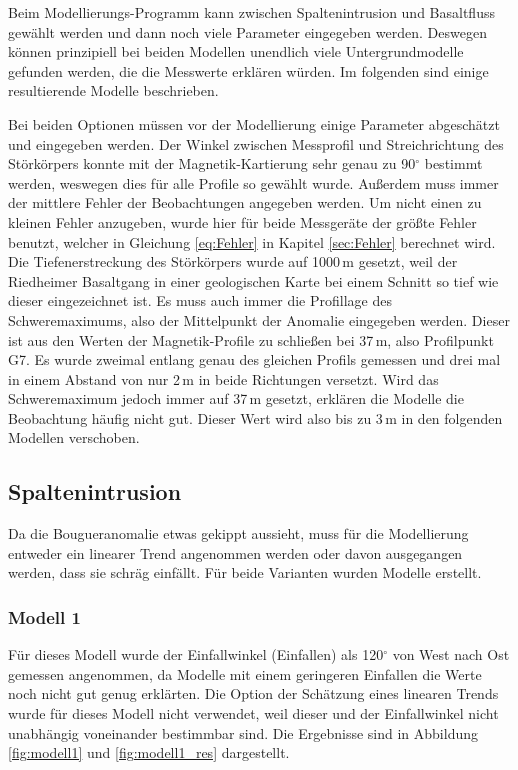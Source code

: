 Beim Modellierungs-Programm kann zwischen Spaltenintrusion und Basaltfluss gewählt werden und dann noch viele Parameter eingegeben werden. Deswegen können prinzipiell bei beiden Modellen unendlich viele Untergrundmodelle gefunden werden, die die Messwerte erklären würden. Im folgenden sind einige resultierende Modelle beschrieben.

Bei beiden Optionen müssen vor der Modellierung einige Parameter abgeschätzt und eingegeben werden. Der Winkel zwischen Messprofil und Streichrichtung des Störkörpers konnte mit der Magnetik-Kartierung sehr genau zu 90$^\circ$ bestimmt werden, weswegen dies für alle Profile so gewählt wurde. Außerdem muss immer der mittlere Fehler der Beobachtungen angegeben werden. Um nicht einen zu kleinen Fehler anzugeben, wurde hier für beide Messgeräte der größte Fehler benutzt, welcher in Gleichung \eqref{eq:Fehler} in Kapitel \ref{sec:Fehler} berechnet wird. Die Tiefenerstreckung des Störkörpers wurde auf 1000\,m gesetzt, weil der Riedheimer Basaltgang in einer geologischen Karte bei einem Schnitt so tief wie dieser eingezeichnet ist. Es muss auch immer die Profillage des Schweremaximums, also der Mittelpunkt der Anomalie eingegeben werden. Dieser ist aus den Werten der Magnetik-Profile zu schließen bei 37\,m, also Profilpunkt G7. Es wurde zweimal entlang genau des gleichen Profils gemessen und drei mal in einem Abstand von nur 2\,m in beide Richtungen versetzt. Wird das Schweremaximum jedoch immer auf 37\,m gesetzt, erklären die Modelle die Beobachtung häufig nicht gut. Dieser Wert wird also bis zu 3\,m in den folgenden Modellen verschoben.

\subsection{Spaltenintrusion}

Da die Bougueranomalie etwas gekippt aussieht, muss für die Modellierung entweder ein linearer Trend angenommen werden oder davon ausgegangen werden, dass sie schräg einfällt. Für beide Varianten wurden Modelle erstellt.

\subsubsection{Modell 1}

Für dieses Modell wurde der Einfallwinkel (Einfallen) als 120$^\circ$ von West nach Ost gemessen angenommen, da Modelle mit einem geringeren Einfallen die Werte noch nicht gut genug erklärten. Die Option der Schätzung eines linearen Trends wurde für dieses Modell nicht verwendet, weil dieser und der Einfallwinkel nicht unabhängig voneinander bestimmbar sind. Die Ergebnisse sind in Abbildung \ref{fig:modell1} und \ref{fig:modell1_res} dargestellt.

